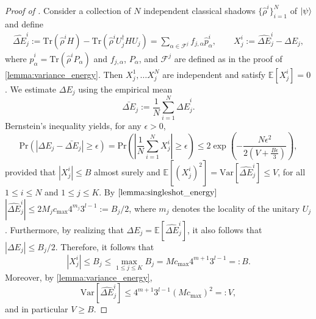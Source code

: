 \begin{proof}[Proof of ]
    Consider a collection of $N$ independent classical shadows $\{\hat{\rho}^i\}_{i=1}^N$ of $\ket{\psi}$ and define
    \begin{align}
        \hat{\Delta E}^i_j:=\mathrm{Tr}\left(\hat{\rho}^iH\right)-\mathrm{Tr}\left(\hat{\rho}^iU_j^\dagger HU_j\right)=\sum_{\alpha\in \mathcal{F}^j}f_{j, \alpha}\hat{p}^i_\alpha,\qquad X^i_j:=\hat{\Delta E}^i_j-\Delta E_j,
    \end{align}
    where $\hat{p}^i_\alpha=\mathrm{Tr}\left(\hat{\rho}^iP_\alpha\right)$ and $f_{j,\alpha}$, $P_\alpha$, and $\mathcal{F}^j$ are defined as in the proof of \cref{lemma:variance_energy}. Then $X^1_j,\ldots X^N_j$ are independent and satisfy $\mathbb{E}\left[X^i_j \right]=0$. We estimate $\Delta E_j$ using the empirical mean 
    \begin{equation}
        \bar{\Delta E}_j:=\frac{1}{N}\sum_{i=1}^N \hat{\Delta E}_j^i.
    \end{equation}
    Bernstein's inequality yields, for any $\epsilon>0$,
    \begin{equation}
        \mathrm{Pr}\left(\left|\Delta E_j-\bar{\Delta E}_j \right|\geq \epsilon\right)=\mathrm{Pr}\left(\left|\frac{1}{N}\sum_{i=1}^NX_j^i \right|\geq \epsilon \right)\leq 2\exp\left(-\frac{N\epsilon^2}{2\left( V+\frac{B\epsilon }{3}\right)} \right),
    \end{equation}
    provided that $\left|X^i_j\right|\leq B$ almost surely and $\mathbb{E}\left[\left(X^i_j \right)^2\right]=\mathrm{Var}\left[\hat{\Delta E}^i_j\right]\leq V$, for all $1\leq i\leq N$ and $1\leq j \leq K$. 
    By $\cref{lemma:singleshot_energy}$ $\left| \hat{\Delta E}^i_j\right|\leq 2M_jc_\mathrm{max}4^{m_j}3^{l-1}:=B_j/2$, where $m_j$ denotes the locality of the unitary $U_j$. Furthermore, by realizing that $\Delta E_j=\mathbb{E}\left[\hat{\Delta E}^i_j\right]$, it also follows that $\left|\Delta E_j\right|\leq B_j/2$. Therefore, it follows that
    \begin{equation}
        \left| X^i_j\right|\leq B_j\leq  \max_{1\leq j\leq K}B_j=Mc_\mathrm{max}4^{m+1}3^{l-1}=:B.
    \end{equation}
    Moreover, by \cref{lemma:variance_energy},
    \begin{equation}
        \mathrm{Var}\left[\hat{\Delta E}^i_j\right]\leq 4^{m+1}3^{l-1}(Mc_\mathrm{max})^2=:V,
    \end{equation}
    and in particular $V\geq B$. 


\end{proof}
